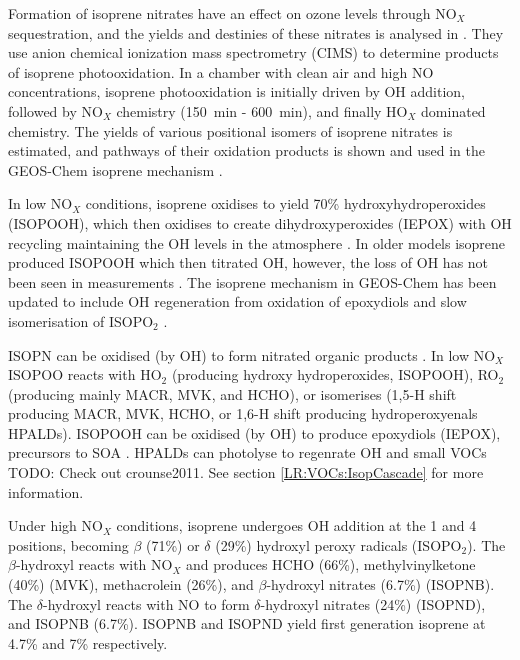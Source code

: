       Formation of isoprene nitrates have an effect on ozone levels through NO$_X$ sequestration, and the yields and destinies of these nitrates is analysed in \citet{Paulot2009a}. 
      They use anion chemical ionization mass spectrometry (CIMS) to determine products of isoprene photooxidation.
      In a chamber with clean air and high NO concentrations, isoprene photooxidation is initially driven by OH addition, followed by NO$_X$ chemistry (150~min - 600~min), and finally HO$_X$ dominated chemistry.
      The yields of various positional isomers of isoprene nitrates is estimated, and pathways of their oxidation products is shown and used in the GEOS-Chem isoprene mechanism \citep{Paulot2009a,Mao2013}. 
      
      In low NO$_X$ conditions, isoprene oxidises to yield 70\% hydroxyhydroperoxides (ISOPOOH), which then oxidises to create dihydroxyperoxides (IEPOX) with OH recycling maintaining the OH levels in the atmosphere \citep{Paulot2009b}.
      In older models isoprene produced ISOPOOH which then titrated OH, however, the loss of OH has not been seen in measurements \citep{Paulot2009b,Mao2013}.
      The isoprene mechanism in GEOS-Chem has been updated to include OH regeneration from oxidation of epoxydiols and slow isomerisation of ISOPO$_2$ \citep{Mao2013}.
      
      ISOPN can be oxidised (by OH) to form nitrated organic products \citep{Paulot2009a}.
      In low NO$_X$ ISOPOO reacts with HO$_2$ (producing hydroxy hydroperoxides, ISOPOOH), RO$_2$ (producing mainly MACR, MVK, and HCHO), or isomerises (1,5-H shift producing MACR, MVK, HCHO, or 1,6-H shift producing hydroperoxyenals HPALDs). 
      ISOPOOH can be oxidised (by OH) to produce epoxydiols (IEPOX), precursors to SOA \citep{Paulot2009b}. 
      HPALDs can photolyse to regenrate OH and small VOCs \citep{Crounse2011,Wolfe2012, Peeters2014} TODO: Check out crounse2011.
      See section \ref{LR:VOCs:IsopCascade} for more information.
      
      Under high NO$_X$ conditions, isoprene undergoes OH addition at the 1 and 4 positions, becoming $\beta$ (71\%) or $\delta$ (29\%) hydroxyl peroxy radicals (ISOPO$_2$). 
      The $\beta$-hydroxyl reacts with NO$_X$ and produces HCHO (66\%), methylvinylketone (40\%) (MVK), methacrolein (26\%), and $\beta$-hydroxyl nitrates (6.7\%) (ISOPNB).
      The $\delta$-hydroxyl reacts with NO to form $\delta$-hydroxyl nitrates (24\%) (ISOPND), and ISOPNB (6.7\%).
      ISOPNB and ISOPND yield first generation isoprene at 4.7\% and 7\% respectively.
      
